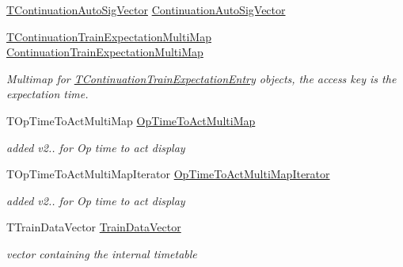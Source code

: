 \begin{DoxyCompactItemize}
\mbox{\hyperlink{class_t_train_controller_a1908f7d1a5dcfebf2f747efbdd6f4681}{T\+Continuation\+Auto\+Sig\+Vector}} \mbox{\hyperlink{class_t_train_controller_a0b412f7b88f829632e54bffc0659ac3b}{Continuation\+Auto\+Sig\+Vector}}
\item 
\mbox{\label{class_t_train_controller_a1a8e542193d93581e0c391d8e7fa3e1b}} 
\mbox{\hyperlink{class_t_train_controller_a36525478ab0d9f59e486b8c030acd87c}{T\+Continuation\+Train\+Expectation\+Multi\+Map}} \mbox{\hyperlink{class_t_train_controller_a1a8e542193d93581e0c391d8e7fa3e1b}{Continuation\+Train\+Expectation\+Multi\+Map}}
\begin{DoxyCompactList}\small\item\em Multimap for \mbox{\hyperlink{class_t_train_controller_1_1_t_continuation_train_expectation_entry}{T\+Continuation\+Train\+Expectation\+Entry}} objects, the access key is the expectation time. \end{DoxyCompactList}\item 
\mbox{\label{class_t_train_controller_af37800c6e9a97ebf632d011291e5070e}} 
T\+Op\+Time\+To\+Act\+Multi\+Map \mbox{\hyperlink{class_t_train_controller_af37800c6e9a97ebf632d011291e5070e}{Op\+Time\+To\+Act\+Multi\+Map}}
\begin{DoxyCompactList}\small\item\em added v2.. for Op time to act display \end{DoxyCompactList}\item 
\mbox{\label{class_t_train_controller_aa35fcf78d6d349c399c8a240508df51d}} 
T\+Op\+Time\+To\+Act\+Multi\+Map\+Iterator \mbox{\hyperlink{class_t_train_controller_aa35fcf78d6d349c399c8a240508df51d}{Op\+Time\+To\+Act\+Multi\+Map\+Iterator}}
\begin{DoxyCompactList}\small\item\em added v2.. for Op time to act display \end{DoxyCompactList}\item 
\mbox{\label{class_t_train_controller_a4e9c9e646d13f9b952434abcd97cec1b}} 
T\+Train\+Data\+Vector \mbox{\hyperlink{class_t_train_controller_a4e9c9e646d13f9b952434abcd97cec1b}{Train\+Data\+Vector}}
\begin{DoxyCompactList}\small\item\em vector containing the internal timetable \end{DoxyCompactList}\item 

\end{DoxyCompactItemize}
